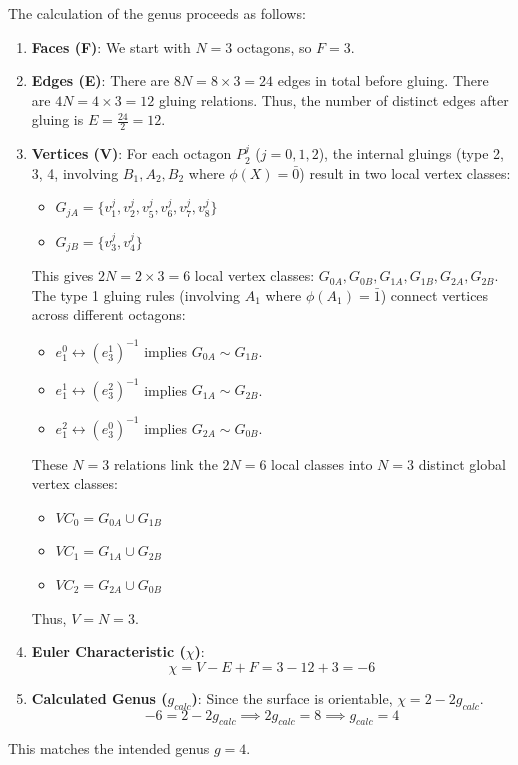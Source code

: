 \documentclass{article}
\theoremstyle{definition}
\theoremstyle{remark}
\begin{document}
The calculation of the genus proceeds as follows:
\begin{enumerate}
    \item \textbf{Faces (F)}: We start with $N=3$ octagons, so $F=3$.
    \item \textbf{Edges (E)}: There are $8N = 8 \times 3 = 24$ edges in total before gluing. There are $4N = 4 \times 3 = 12$ gluing relations. Thus, the number of distinct edges after gluing is $E = \frac{24}{2} = 12$.
    \item \textbf{Vertices (V)}:
        For each octagon $P_2^j$ ($j=0,1,2$), the internal gluings (type 2, 3, 4, involving $B_1, A_2, B_2$ where $\phi(X)=\bar{0}$) result in two local vertex classes:
        \begin{itemize}
            \item $G_{jA} = \{v_1^j, v_2^j, v_5^j, v_6^j, v_7^j, v_8^j\}$
            \item $G_{jB} = \{v_3^j, v_4^j\}$
        \end{itemize}
        This gives $2N = 2 \times 3 = 6$ local vertex classes: $G_{0A}, G_{0B}, G_{1A}, G_{1B}, G_{2A}, G_{2B}$.
        The type 1 gluing rules (involving $A_1$ where $\phi(A_1)=\bar{1}$) connect vertices across different octagons:
        \begin{itemize}
            \item $e_1^0 \leftrightarrow (e_3^1)^{-1}$ implies $G_{0A} \sim G_{1B}$.
            \item $e_1^1 \leftrightarrow (e_3^2)^{-1}$ implies $G_{1A} \sim G_{2B}$.
            \item $e_1^2 \leftrightarrow (e_3^0)^{-1}$ implies $G_{2A} \sim G_{0B}$.
        \end{itemize}
        These $N=3$ relations link the $2N=6$ local classes into $N=3$ distinct global vertex classes:
        \begin{itemize}
            \item $VC_0 = G_{0A} \cup G_{1B}$
            \item $VC_1 = G_{1A} \cup G_{2B}$
            \item $VC_2 = G_{2A} \cup G_{0B}$
        \end{itemize}
        Thus, $V=N=3$.
    \item \textbf{Euler Characteristic ($\chi$)}:
    $$ \chi = V - E + F = 3 - 12 + 3 = -6 $$
    \item \textbf{Calculated Genus ($g_{calc}$)}:
    Since the surface is orientable, $\chi = 2 - 2g_{calc}$.
    $$ -6 = 2 - 2g_{calc} \implies 2g_{calc} = 8 \implies g_{calc} = 4 $$
\end{enumerate}
This matches the intended genus $g=4$.
\end{document}
